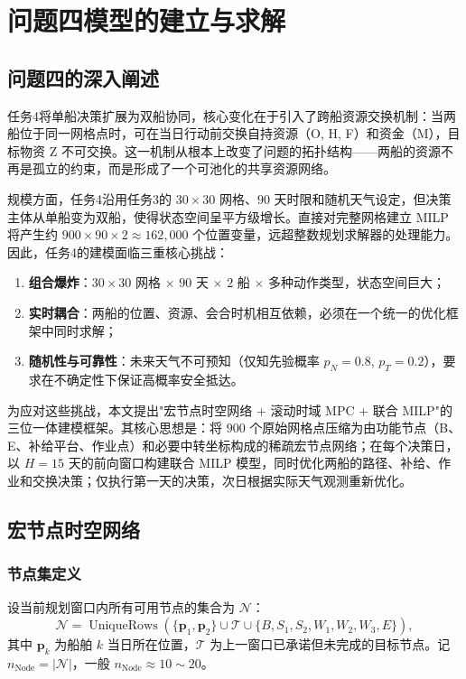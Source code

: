 \section{问题四模型的建立与求解}
\subsection{问题四的深入阐述}

任务4将单船决策扩展为双船协同，核心变化在于引入了跨船资源交换机制：当两船位于同一网格点时，可在当日行动前交换自持资源（O, H, F）和资金（M），目标物资 Z 不可交换。这一机制从根本上改变了问题的拓扑结构——两船的资源不再是孤立的约束，而是形成了一个可池化的共享资源网络。

规模方面，任务4沿用任务3的 $30\times30$ 网格、$90$ 天时限和随机天气设定，但决策主体从单船变为双船，使得状态空间呈平方级增长。直接对完整网格建立 MILP 将产生约 $900\times90\times2\approx 162,000$ 个位置变量，远超整数规划求解器的处理能力。因此，任务4的建模面临三重核心挑战：

\begin{enumerate}
    \item \textbf{组合爆炸}：$30\times30$ 网格 $\times$ $90$ 天 $\times$ $2$ 船 $\times$ 多种动作类型，状态空间巨大；
    \item \textbf{实时耦合}：两船的位置、资源、会合时机相互依赖，必须在一个统一的优化框架中同时求解；
    \item \textbf{随机性与可靠性}：未来天气不可预知（仅知先验概率 $p_N=0.8$, $p_T=0.2$），要求在不确定性下保证高概率安全抵达。
\end{enumerate}

为应对这些挑战，本文提出"宏节点时空网络 + 滚动时域 MPC + 联合 MILP"的三位一体建模框架。其核心思想是：将 $900$ 个原始网格点压缩为由功能节点（B、E、补给平台、作业点）和必要中转坐标构成的稀疏宏节点网络；在每个决策日，以 $H=15$ 天的前向窗口构建联合 MILP 模型，同时优化两船的路径、补给、作业和交换决策；仅执行第一天的决策，次日根据实际天气观测重新优化。

\subsection{宏节点时空网络}

\subsubsection{节点集定义}

设当前规划窗口内所有可用节点的集合为 $\mathcal{N}$：
\begin{equation}
\mathcal{N} = \operatorname{UniqueRows}\left(\{\mathbf{p}_1, \mathbf{p}_2\} \cup \mathcal{T} \cup \{B, S_1, S_2, W_1, W_2, W_3, E\}\right),
\end{equation}
其中 $\mathbf{p}_k$ 为船舶 $k$ 当日所在位置，$\mathcal{T}$ 为上一窗口已承诺但未完成的目标节点。记 $n_{\text{Node}}=|\mathcal{N}|$，一般 $n_{\text{Node}}\approx 10\sim20$。

